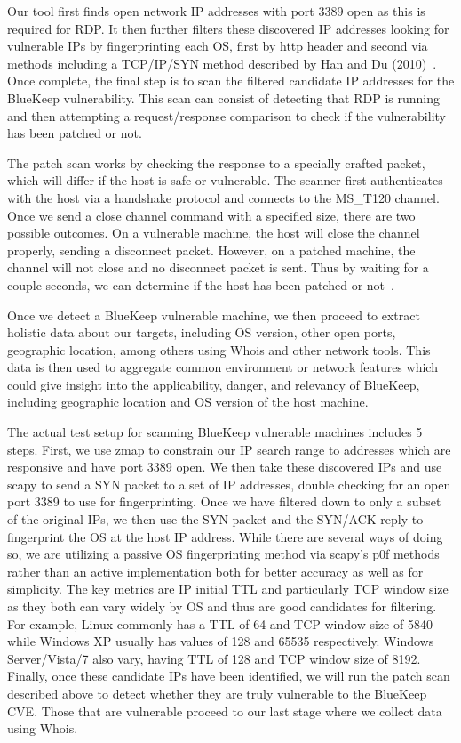 Our tool first finds open network IP addresses with port 3389 open as this is required for RDP. It then further filters these discovered IP addresses looking for vulnerable IPs by fingerprinting each OS, first by http header and second via methods including a TCP/IP/SYN method described by Han and Du (2010)~\cite{han_du_2010}. Once complete, the final step is to scan the filtered candidate IP addresses for the BlueKeep vulnerability. This scan can consist of detecting that RDP is running and then attempting a request/response comparison to check if the vulnerability has been patched or not.

The patch scan works by checking the response to a specially crafted packet, which will differ if the host is safe or vulnerable. The scanner first authenticates with the host via a handshake protocol and connects to the MS\_T120 channel. Once we send a close channel command with a specified size, there are two possible outcomes. On a vulnerable machine, the host will close the channel properly, sending a disconnect packet. However, on a patched machine, the channel will not close and no disconnect packet is sent. Thus by waiting for a couple seconds, we can determine if the host has been patched or not~\cite{dillon_2019}.

Once we detect a BlueKeep vulnerable machine, we then proceed to extract holistic data about our targets, including OS version, other open ports, geographic location, among others using Whois and other network tools. This data is then used to aggregate common environment or network features which could give insight into the applicability, danger, and relevancy of BlueKeep, including geographic location and OS version of the host machine.

The actual test setup for scanning BlueKeep vulnerable machines includes 5 steps. First, we use zmap to constrain our IP search range to addresses which are responsive and have port 3389 open. We then take these discovered IPs and use scapy to send a SYN packet to a set of IP addresses, double checking for an open port 3389 to use for fingerprinting. Once we have filtered down to only a subset of the original IPs, we then use the SYN packet and the SYN/ACK reply to fingerprint the OS at the host IP address. While there are several ways of doing so, we are utilizing a passive OS fingerprinting method via scapy's p0f methods rather than an active implementation both for better accuracy as well as for simplicity. The key metrics are IP initial TTL and particularly TCP window size as they both can vary widely by OS and thus are good candidates for filtering. For example, Linux commonly has a TTL of 64 and TCP window size of 5840 while Windows XP usually has values of 128 and 65535 respectively. Windows Server/Vista/7 also vary, having TTL of 128 and TCP window size of 8192. Finally, once these candidate IPs have been identified, we will run the patch scan described above to detect whether they are truly vulnerable to the BlueKeep CVE. Those that are vulnerable proceed to our last stage where we collect data using Whois.
